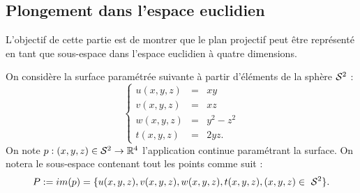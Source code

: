 \documentclass[hidelinks, 10pt]{article}
\begin{document}
\subsection{Plongement dans l'espace euclidien}

L'objectif de cette partie est de montrer que le plan projectif peut être représenté en tant que sous-espace dans l'espace euclidien à quatre dimensions.

\begin{definition}
On considère la surface paramétrée suivante à partir d'éléments de la sphère $\mathcal{S}^{2}$ : \begin{equation}
\left\{\begin{matrix}
u(x,y,z)&=&xy\\ 
v(x,y,z)&=&xz\\ 
w(x,y,z)&=&y^2-z^2\\ 
t(x,y,z)&=&2yz.
\end{matrix}\right.
\end{equation}On note $p:(x,y,z)\in\mathcal{S}^{2}\rightarrow \mathbb{R}^4$ l'application continue paramétrant la surface. On notera le sous-espace contenant tout les points comme suit : $$P:=im(p)=\{u(x,y,z), v(x,y,z), w(x,y,z), t(x,y,z),(x,y,z)\in~\mathcal{S}^{2}\}.$$
\end{definition}
\end{document}
